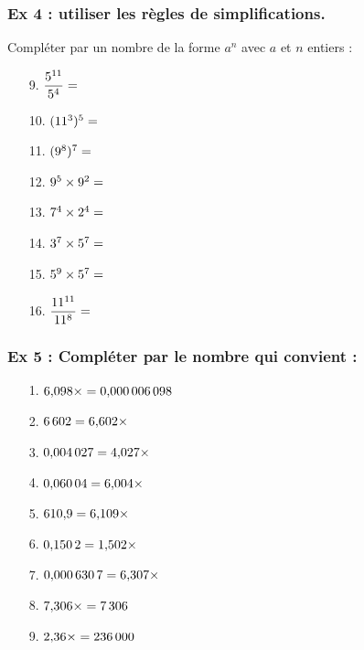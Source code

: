 \documentclass[10pt]{article}
\begin{document}
\subsubsection*{Ex 4 : utiliser les règles de simplifications.}

Compléter par un nombre de la forme $a^n$ avec $a$ et $n$ entiers :

\begin{multicols}{4}
  \begin{enumerate}
  \item[9.] $\dfrac{5^{11}}{5^{4}} = \dotfill$
  \item[10.] $(11^{3})^{5} = \dotfill$
  \item[11.] $(9^{8})^{7} = \dotfill$
  \item[12.] $9^{5} \times 9^{2} = \dotfill$
  \item[13.] $7^{4}  \times  2^{4}  =  \dotfill$
  \item[14.] $3^{7}  \times  5^{7}  =  \dotfill$
  \item[15.] $5^{9} \times 5^{7} = \dotfill$
  \item[16.] $\dfrac{11^{11}}{11^{8}} = \dotfill$
  \end{enumerate}
\end{multicols}


\subsubsection*{Ex 5 : Compléter par le nombre qui convient :}

\begin{multicols}{3}

  \begin{enumerate}
  \item[1.] $6{,}098 \times \dotfill = 0{,}000\,006\,098$
  \item[2.] $6\,602 = 6{,}602 \times \dotfill$
  \item[3.] $0{,}004\,027 = 4{,}027 \times \dotfill$
  \item[4.] $0{,}060\,04 = 6{,}004 \times \dotfill$
  \item[5.] $610{,}9 = 6{,}109 \times \dotfill$
  \item[6.] $0{,}150\,2 = 1{,}502 \times \dotfill$
  \item[7.] $0{,}000\,630\,7 = 6{,}307 \times \dotfill$
  \item[8.] $7{,}306 \times \dotfill = 7\,306$
  \item[9.] $2{,}36 \times \dotfill = 236\,000$
  \end{enumerate}
\end{multicols}
\end{document}
